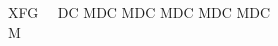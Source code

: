 XFG                        DC MDC MDC MDC MDC MDC M                              